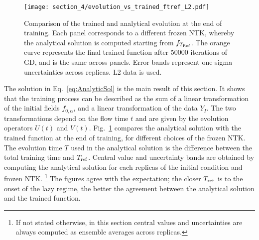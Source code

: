 \begin{figure}[t]
  \centering
  \texttt{[image: section\_4/evolution\_vs\_trained\_ftref\_L2.pdf]} 
  \caption{Comparison of the trained and analytical evolution at the end of
  training. Each panel corresponds to a different frozen NTK, whereby the
  analytical solution is computed starting from $f_{T_{\rm Ref}}$. The orange
  curve represents the final trained function after 50000 iterations of GD, and
  is the same across panels. Error bands represent one-sigma uncertainties
  across replicas. L2 data is used.}
  \label{fig:OnsetLazyL2}
\end{figure}
The solution in Eq.~\eqref{eq:AnalyticSol} is the main result of this section.
It shows that the training process can be described as the sum of a linear
transformation of the initial fields $f_{0,\alpha}$, and a linear transformation
of the data $Y_I$. The two transformations depend on the flow time $t$ and are
given by the evolution operators $U(t)$ and $V(t)$. Fig.~\ref{fig:OnsetLazyL2}
compares the analytical solution with the trained function at the end of
training, for different choices of the frozen NTK. The evolution time $T$ used
in the analytical solution is the difference between the total training time and
$T_{\rm ref}$. Central value and uncertainty bands are obtained by computing the
analytical solution for each replicas of the initial condition and frozen NTK.
\footnote{
  If not stated otherwise, in this section central values and uncertainties are
  always computed as ensemble averages across replicas.
}
The figures agree with the expectation; the closer $T_{\rm ref}$ is to the
onset of the lazy regime, the better the agreement between the analytical
solution and the trained function.

